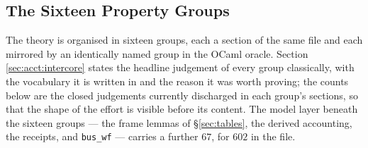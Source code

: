 \documentclass[10pt,journal,compsoc,twocolumn]{article}
\theoremstyle{definition}
\theoremstyle{remark}
\theoremstyle{plain}
\newcommand{\ctr}[1]{\texttt{#1}}
\begin{document}
\subsection{The Sixteen Property Groups}
The theory is organised in sixteen groups, each a section of the same file and
each mirrored by an identically named group in the OCaml oracle. Section
\ref{sec:acct:intercore} states the headline judgement of every group
classically, with the vocabulary it is written in and the reason it was worth
proving; the counts below are the closed judgements currently discharged in each
group's sections, so that the shape of the effort is visible before its content.
The model layer beneath the sixteen groups --- the frame lemmas of
\S\ref{sec:tables}, the derived accounting, the receipts, and \ctr{bus\_wf} ---
carries a further \(67\), for \(602\) in the file.
\end{document}

